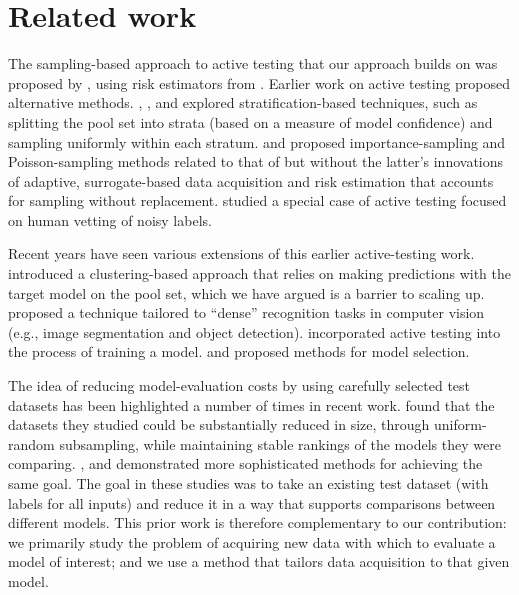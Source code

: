 \section{Related work}

The sampling-based approach to active testing that our approach builds on was proposed by \citet{kossen2021active}, using risk estimators from \citet{farquhar2021statistical}.
Earlier work on active testing proposed alternative methods.
\citet{bennett2010online}, \citet{ji2021active}, \citet{katariya2012active} and \citet{kumar2018classifier} explored stratification-based techniques, such as splitting the pool set into strata (based on a measure of model confidence) and sampling uniformly within each stratum.
\citet{sawade2010active} and \citet{yilmaz2021sample} proposed importance-sampling and Poisson-sampling methods related to that of \citet{kossen2021active} but without the latter's innovations of adaptive, surrogate-based data acquisition and risk estimation that accounts for sampling without replacement.
\citet{nguyen2018active} studied a special case of active testing focused on human vetting of noisy labels.

Recent years have seen various extensions of this earlier active-testing work.
\citet{huang2025active} introduced a clustering-based approach that relies on making predictions with the target model on the pool set, which we have argued is a barrier to scaling up.
\citet{su2024metaat} proposed a technique tailored to ``dense'' recognition tasks in computer vision (e.g., image segmentation and object detection).
\citet{yu2024actively} incorporated active testing into the process of training a model.
\citet{ashurytahan2024label} and \citet{hara2024active} proposed methods for model selection.

The idea of reducing model-evaluation costs by using carefully selected test datasets has been highlighted a number of times in recent work.
\citet{maynez2023benchmarking} found that the datasets they studied could be substantially reduced in size, through uniform-random subsampling, while maintaining stable rankings of the models they were comparing.
\citet{polo2024tinybenchmarks}, \citet{saranathan2024dele} and \citet{vivek2024anchor} demonstrated more sophisticated methods for achieving the same goal.
The goal in these studies was to take an existing test dataset (with labels for all inputs) and reduce it in a way that supports comparisons between different models.
This prior work is therefore complementary to our contribution: we primarily study the problem of acquiring new data with which to evaluate a model of interest; and we use a method that tailors data acquisition to that given model.